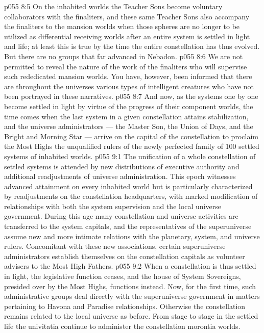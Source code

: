 \vs p055 8:5 \pc On the inhabited worlds the Teacher Sons become voluntary collaborators with the finaliters, and these same Teacher Sons also accompany the finaliters to the mansion worlds when those spheres are no longer to be utilized as differential receiving worlds after an entire system is settled in light and life; at least this is true by the time the entire constellation has thus evolved. But there are no groups that far advanced in Nebadon.
\vs p055 8:6 We are not permitted to reveal the nature of the work of the finaliters who will supervise such rededicated mansion worlds. You have, however, been informed that there are throughout the universes various types of intelligent creatures who have not been portrayed in these narratives.
\vs p055 8:7 \pc And now, as the systems one by one become settled in light by virtue of the progress of their component worlds, the time comes when the last system in a given constellation attains stabilization, and the universe administrators --- the Master Son, the Union of Days, and the Bright and Morning Star --- arrive on the capital of the constellation to proclaim the Most Highs the unqualified rulers of the newly perfected family of 100 settled systems of inhabited worlds.
\vs p055 9:1 The unification of a whole constellation of settled systems is attended by new distributions of executive authority and additional readjustments of universe administration. This epoch witnesses advanced attainment on every inhabited world but is particularly characterized by readjustments on the constellation headquarters, with marked modification of relationships with both the system supervision and the local universe government. During this age many constellation and universe activities are transferred to the system capitals, and the representatives of the superuniverse assume new and more intimate relations with the planetary, system, and universe rulers. Concomitant with these new associations, certain superuniverse administrators establish themselves on the constellation capitals as volunteer advisers to the Most High Fathers.
\vs p055 9:2 When a constellation is thus settled in light, the legislative function ceases, and the house of System Sovereigns, presided over by the Most Highs, functions instead. Now, for the first time, such administrative groups deal directly with the superuniverse government in matters pertaining to Havona and Paradise relationships. Otherwise the constellation remains related to the local universe as before. From stage to stage in the settled life the univitatia continue to administer the constellation morontia worlds.
